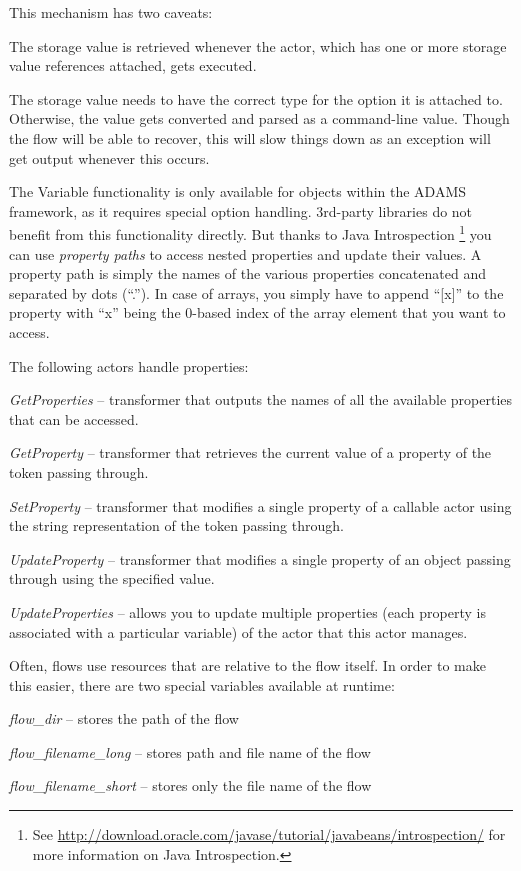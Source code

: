 This mechanism has two caveats:
\begin{tight_itemize}
	\item The storage value is retrieved whenever the actor, which has one or more
	storage value references attached, gets executed.
	\item The storage value needs to have the correct type for the option it is
	attached to. Otherwise, the value gets converted and parsed as a command-line
	value. Though the flow will be able to recover, this will slow things down
	as an exception will get output whenever this occurs.
\end{tight_itemize}

The Variable functionality is only available for objects within the ADAMS
framework, as it requires special option handling. 3rd-party libraries do not
benefit from this functionality directly. But thanks to Java Introspection
\footnote{See
\url{http://download.oracle.com/javase/tutorial/javabeans/introspection/}{} for
more information on Java Introspection.} you can use \textit{property paths} to
access nested properties and update their values. A property path is simply the
names of the various properties concatenated and separated by dots (``.''). In
case of arrays, you simply have to append ``[x]'' to the property with ``x''
being the 0-based index of the array element that you want to access.

The following actors handle properties:
\begin{tight_itemize}
	\item \textit{GetProperties} -- transformer that outputs the names
	of all the available properties that can be accessed.
	\item \textit{GetProperty} -- transformer that retrieves the current
	value of a property of the token passing through.
	\item \textit{SetProperty} -- transformer that modifies a single property of a
	callable actor using the string representation of the token passing through.
	\item \textit{UpdateProperty} -- transformer that modifies a single property
	of an object passing through using the specified value.
	\item \textit{UpdateProperties} -- allows you to update multiple properties
	(each property is associated with a particular variable) of the actor that
	this actor manages.
\end{tight_itemize}

Often, flows use resources that are relative to the flow itself. In order to
make this easier, there are two special variables available at runtime:
\begin{tight_itemize}
	\item \textit{flow\_dir} -- stores the path of the flow
	\item \textit{flow\_filename\_long} -- stores path and file name of the flow
	\item \textit{flow\_filename\_short} -- stores only the file name of the flow
\end{tight_itemize}

